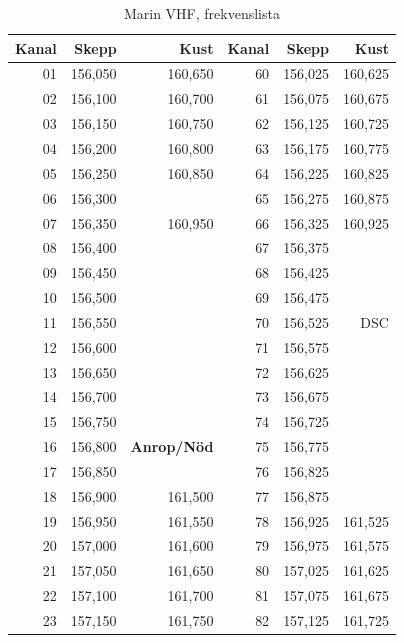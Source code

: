 \begin{longtable}{rrr|rrr}
\caption{Marin VHF, frekvenslista} \\
\textbf{Kanal} & \textbf{Skepp} & \textbf{Kust} &
\textbf{Kanal} & \textbf{Skepp} & \textbf{Kust} \\ \hline \endhead

01  & 156,050 & 160,650       & 60  & 156,025 & 160,625 \\
02  & 156,100 & 160,700       & 61  & 156,075 & 160,675 \\
03  & 156,150 & 160,750       & 62  & 156,125 & 160,725 \\
04  & 156,200 & 160,800       & 63  & 156,175 & 160,775 \\
05  & 156,250 & 160,850       & 64  & 156,225 & 160,825 \\
06  & 156,300 &               & 65  & 156,275 & 160,875 \\
07  & 156,350 & 160,950       & 66  & 156,325 & 160,925 \\
08  & 156,400 &               & 67  & 156,375 &         \\
09  & 156,450 &               & 68  & 156,425 &         \\
10  & 156,500 &               & 69  & 156,475 &         \\
11  & 156,550 &               & 70  & 156,525 & DSC     \\
12  & 156,600 &               & 71  & 156,575 &         \\
13  & 156,650 &               & 72  & 156,625 &         \\
14  & 156,700 &               & 73  & 156,675 &         \\
15  & 156,750 &               & 74  & 156,725 &         \\
16  & 156,800 & \bf Anrop/Nöd & 75  & 156,775 &         \\
17  & 156,850 &               & 76  & 156,825 &         \\
18  & 156,900 & 161,500       & 77  & 156,875 &         \\
19  & 156,950 & 161,550       & 78  & 156,925 & 161,525 \\
20  & 157,000 & 161,600       & 79  & 156,975 & 161,575 \\
21  & 157,050 & 161,650       & 80  & 157,025 & 161,625 \\
22  & 157,100 & 161,700       & 81  & 157,075 & 161,675 \\
23  & 157,150 & 161,750       & 82  & 157,125 & 161,725 \\

\end{longtable}
